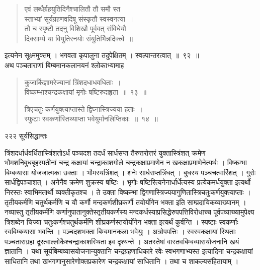 \documentclass[11pt, openany]{book}
\begin{document}

\begin{quote}
{\qt एवं लब्धैर्ग्रहयुतिदिनैश्चालितौ तौ समौ स्त \\
स्ताभ्यां सूर्यग्रहणवदिषू संस्कृतौ स्वस्वनत्या~।\\
तौ च स्पृष्टौ तदनु विशिखौ पूर्ववत् संविधेयौ \\
दिक्साम्ये या वियुतिरनयोः संयुतिर्भिन्नदिक्त्वे~॥ \\ }
\end{quote}


 इत्यनेन सूक्ष्ममुक्तम् । भगवता कृपालुना तदुपेक्षितम् । स्वल्पान्तरत्वात्~॥~९२~॥\\
 \noindent अथ पञ्चताराणां बिम्बमानकलानयनं श्लोकाभ्यामाह \textendash


\begin{quote}
{\ssi कुजार्किज्ञामरेज्यानां त्रिंशदधाधवधिताः~।\\
 विष्कम्भाश्चन्द्रकक्षायां मृगोः षष्टिरुदाहृता~॥~१३~॥

त्रिएचतुः कर्णयुक्त्याप्तास्ते द्विघ्नास्त्रिज्यया हताः~।\\
स्फुटाः स्वकर्णास्तिथ्याप्ता भवेयुर्मानलिप्तिकाः~॥~१४~॥}
\end{quote}
\newpage

\noindent २२२ \hspace{4cm} सूर्यसिद्धान्तः 
\vspace{1cm}


 त्रिंशदर्धार्धवर्धितास्त्रिंशतोऽर्धं पञ्चदश तदर्धं सार्धसप्त तैरुत्तरोत्तरं युक्तास्त्रिंशत् क्रमेण भौमशनिबुधबृहस्पतीनां चन्द्र कक्षायां चन्द्राकाशगोले चन्द्रकक्षाप्रमाणेन न खकक्षाप्रमाणेनेत्यर्थः । विष्कम्भा बिम्बव्यासा योजजात्मका उक्ताः । भौमस्यत्रिंशत् । शनेः सार्धसप्तत्रिंधत् । बुधस्य पञ्चचत्वारिंशत् । गुरोः सार्धद्विपञ्चाशत् । अनेनैव क्रमेण शुक्रस्य षष्टिः । भृगोः षष्टिरित्यनेनार्धार्धेत्यस्य प्रत्येकमर्धयुक्ता इत्यर्थो निरस्तः स्वाभिमतार्थो व्यक्तीकृतश्च । ते उक्ता विष्कम्भा द्विगणास्त्रिज्ययागुणितास्त्रिचतुःकर्णयुक्त्याप्ताः । तृतीयकर्मणि चतुर्थकर्मणि च यौ कर्णौ मन्दकर्णशीघ्रकर्णौ तयोर्योगेन भक्ता इति साम्प्रदायिकव्याख्यानम् । नव्यास्तु तृतीयकर्मणि कर्णानुपातानुक्तेस्तृतीयकर्णस्य मन्दकर्धस्याप्रसिद्धेरुपपत्तिविरोधाच्च पूर्वपव्याख्यामुपेक्ष्य त्रिशब्देन चिज्या चतुःकर्णश्चतुर्थकर्मणि शीघ्रकर्णस्तयोर्योगेन भक्ता इत्यर्थं कुर्वन्ति । स्पष्टाः स्वकर्णाः स्वबिम्बव्यासा भवन्ति । पञ्चदशभक्ता बिम्बमानकला भवेयुः । अत्रोपपत्तिः । स्वस्वकक्षायां स्थिताः पञ्चताराग्रहा दूरत्वाल्लोकैश्चन्द्राकाशस्थिता इव दृश्यन्ते । अतस्तेषां वास्तवबिम्बव्यासयोजनानि खयं ज्ञातानि । यथा सूर्यबिम्बव्यासयोजनान्युक्तानि चन्द्रग्रहणाधिकारे रवेः स्वभगणाभ्यस्त इत्यादिना चन्द्रकक्षायां साधितानि तथा खभगणानुसारेणोक्तप्रकारेण चन्द्रकक्षायां साधितानि । तथा च शाकल्यसंहितायाम् । 
\end{document}
